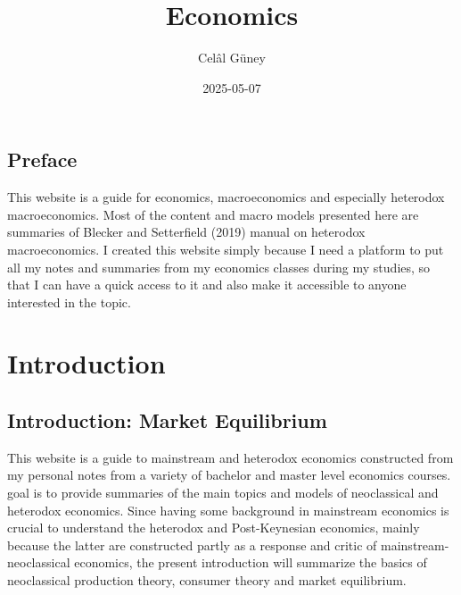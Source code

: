 \documentclass[
  letterpaper,
  DIV=11,
  numbers=noendperiod]{scrreprt}
\title{Economics}
\author{Celâl Güney}
\date{2025-05-07}
\renewcommand*\contentsname{Table of contents}
\newcommand\contentsname{Table of contents}
\begin{document}
\maketitle
\ifdefined\Shaded\renewenvironment{Shaded}{\begin{tcolorbox}[borderline west={3pt}{0pt}{shadecolor}, boxrule=0pt, breakable, sharp corners, interior hidden, frame hidden, enhanced]}{\end{tcolorbox}}\fi

\renewcommand*\contentsname{Table of contents}
{
\hypersetup{linkcolor=}
\setcounter{tocdepth}{2}
\tableofcontents
}

\hypertarget{preface}{%
\chapter*{Preface}\label{preface}}


This website is a guide for economics, macroeconomics and especially
heterodox macroeconomics. Most of the content and macro models presented
here are summaries of Blecker and Setterfield (2019) manual on heterodox
macroeconomics. I created this website simply because I need a platform
to put all my notes and summaries from my economics classes during my
studies, so that I can have a quick access to it and also make it
accessible to anyone interested in the topic.

\part{Introduction}

\hypertarget{introduction-market-equilibrium}{%
\chapter{Introduction: Market
Equilibrium}\label{introduction-market-equilibrium}}

This website is a guide to mainstream and heterodox economics
constructed from my personal notes from a variety of bachelor and master
level economics courses. goal is to provide summaries of the main topics
and models of neoclassical and heterodox economics. Since having some
background in mainstream economics is crucial to understand the
heterodox and Post-Keynesian economics, mainly because the latter are
constructed partly as a response and critic of mainstream-neoclassical
economics, the present introduction will summarize the basics of
neoclassical production theory, consumer theory and market equilibrium.
\end{document}
